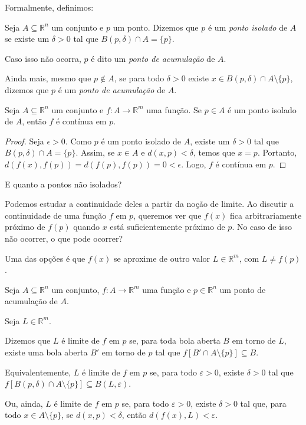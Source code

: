 Formalmente, definimos:

\begin{definition}
    Seja $A\subseteq \mathbb R^n$ um conjunto e $p$ um ponto. Dizemos que $p$ é um \emph{ponto isolado}  de $A$ se existe um $\delta>0$ tal que $B(p,\delta) \cap A = \{p\}$.

    Caso isso não ocorra, $p$ é dito um \emph{ponto de acumulação}  de $A$.

    Ainda mais, mesmo que $p \notin A$, se para todo $\delta>0$ existe $x \in B(p,\delta) \cap A\setminus\{p\}$, dizemos que $p$ é um \emph{ponto de acumulação} de $A$.
\end{definition}

\begin{proposition}
    Seja $A\subseteq \mathbb R^n$ um conjunto e $f: A \to \mathbb R^m$ uma função. Se $p \in A$ é um ponto isolado de $A$, então $f$ é contínua em $p$.
\end{proposition}

\begin{proof}
    Seja $\epsilon>0$. Como $p$ é um ponto isolado de $A$, existe um $\delta>0$ tal que $B(p,\delta) \cap A = \{p\}$. Assim, se $x \in A$ e $d(x, p) < \delta$, temos que $x = p$. Portanto, $d(f(x), f(p)) = d(f(p), f(p)) = 0 < \epsilon$. Logo, $f$ é contínua em $p$.
\end{proof}

E quanto a pontos não isolados?

Podemos estudar a continuidade deles a partir da noção de limite.
Ao discutir a continuidade de uma função $f$ em $p$, queremos ver que $f(x)$ fica arbitrariamente próximo de $f(p)$ quando $x$ está suficientemente próximo de $p$.
No caso de isso não ocorrer, o que pode ocorrer?

Uma das opções é que $f(x)$ se aproxime de outro valor $L \in \mathbb R^m$, com $L \neq f(p)$.

\begin{definition}
    Seja $A\subseteq \mathbb R^n$ um conjunto, $f: A \to \mathbb R^m$ uma função e $p \in \mathbb R^n$ um ponto de acumulação de $A$.

    Seja $L \in \mathbb R^m$.

    Dizemos que $L$ é limite de $f$ em $p$ se, para toda bola aberta $B$ em torno de $L$, existe uma bola aberta $B'$ em torno de $p$ tal que $f[B'\cap A\setminus\{p\}]\subseteq B$.

    Equivalentemente, $L$ é limite de $f$ em $p$ se, para todo $\varepsilon > 0$, existe $\delta > 0$ tal que $f[B(p, \delta)\cap A\setminus\{p\}]\subseteq B(L, \varepsilon)$.

        Ou, ainda, $L$ é limite de $f$ em $p$ se, para todo $\varepsilon > 0$, existe $\delta > 0$ tal que, para todo $x \in A\setminus\{p\}$, se $d(x, p) < \delta$, então $d(f(x), L) < \varepsilon$.
\end{definition}

